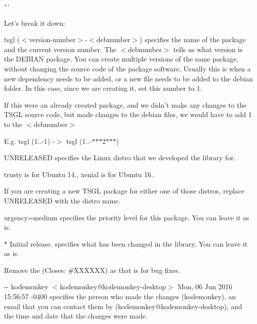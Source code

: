 ```

Let's break it down\-:


\begin{DoxyItemize}
\item {\ttfamily tsgl ($<$version-\/number$>$-\/$<$debnumber$>$)} specifies the name of the package and the current version number. The {\ttfamily $<$debnumber$>$} tells us what version is the D\-E\-B\-I\-A\-N package. You can create multiple versions of the same package, without changing the source code of the package software. Usually this is when a new dependency needs to be added, or a new file needs to be added to the {\ttfamily debian} folder. In this case, since we are creating it, set this number to 1.
\end{DoxyItemize}

If this were an already created package, and we didn't make any changes to the T\-S\-G\-L source code, but made changes to the {\ttfamily debian} files, we would have to add 1 to the {\ttfamily $<$debnumber$>$}

E.\-g. tsgl (1..-\/1) -\/$>$ tsgl (1..-\/$\ast$$\ast$$\ast$2$\ast$$\ast$$\ast$)


\begin{DoxyItemize}
\item {\ttfamily U\-N\-R\-E\-L\-E\-A\-S\-E\-D} specifies the Linux distro that we developed the library for.
\end{DoxyItemize}

{\ttfamily trusty} is for {\ttfamily Ubuntu 14.}, {\ttfamily xenial} is for {\ttfamily Ubuntu 16.}.

If you are creating a new T\-S\-G\-L package for either one of those distros, replace {\ttfamily U\-N\-R\-E\-L\-E\-A\-S\-E\-D} with the distro name.


\begin{DoxyItemize}
\item {\ttfamily urgency=medium} specifies the priority level for this package. You can leave it as is.
\item {\ttfamily $\ast$ Initial release.} specifies what has been changed in the library. You can leave it as is.
\item Remove the {\ttfamily (Closes\-: \#\-X\-X\-X\-X\-X\-X)} as that is for bug fixes.
\item {\ttfamily -\/-\/ kodemonkey $<$kodemonkey@kodemonkey-\/desktop$>$ Mon, 06 Jun 2016 15\-:56\-:57 -\/0400} specifies the person who made the changes ({\ttfamily kodemonkey}), an email that you can contact them by ({\ttfamily kodemonkey@kodemonkey-\/desktop}), and the time and date that the changes were made.
\end{DoxyItemize}

